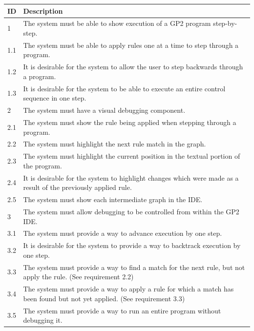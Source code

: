 \documentclass[authoryearcitations]{UoYCSproject}
\begin{document}
\begin{table}[tbp]
    \begin{tabularx}{\linewidth}{|l|X|}
        \hline
        \textbf{ID} & \textbf{Description} \\
        \hline
        1    &  The system must be able to show execution of a GP2 program step-by-step. \\ \hline
        1.1  &  The system must be able to apply rules one at a time to step through
                a program. \\ \hline
        1.2  &  It is desirable for the system to allow the user to step
                backwards through a program. \\ \hline
        1.3  &  It is desirable for the system to be able to execute an entire control
                sequence in one step. \\ \hline

        2    &  The system must have a visual debugging component. \\ \hline
        2.1  &  The system must show the rule being applied when stepping
                through a program. \\ \hline
        2.2  &  The system must highlight the next rule match in the graph. \\ \hline
        2.3  &  The system must highlight the current position in the textual
                portion of the program. \\ \hline
        2.4  &  It is desirable for the system to highlight changes which were
                made as a result of the previously applied rule. \\ \hline
        2.5  &  The system must show each intermediate graph in the IDE. \\ \hline

        3    &  The system must allow debugging to be controlled from within the
                GP2 IDE. \\ \hline
        3.1  &  The system must provide a way to advance execution by one step. \\ \hline
        3.2  &  It is desirable for the system to provide a way to backtrack
                execution by one step. \\ \hline
        3.3  &  The system must provide a way to find a match for the next rule,
                but not apply the rule. (See requirement 2.2) \\ \hline
        3.4  &  The system must provide a way to apply a rule for which a match
                has been found but not yet applied. (See requirement 3.3) \\ \hline
        3.5  &  The system must provide a way to run an entire program without
                debugging it. \\ \hline


\end{tabularx}
\end{table}
\end{document}
